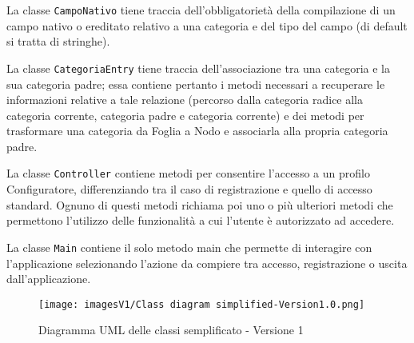 La classe \texttt{CampoNativo} tiene traccia dell'obbligatorietà della compilazione di un campo nativo o ereditato relativo a una categoria e del tipo del campo (di default si tratta di stringhe). 

La classe \texttt{CategoriaEntry} tiene traccia dell'associazione tra una categoria e la sua categoria padre; essa contiene pertanto i metodi necessari a recuperare le informazioni relative a tale relazione (percorso dalla categoria radice alla categoria corrente, categoria padre e categoria corrente) e dei metodi per trasformare una categoria da Foglia a Nodo e associarla alla propria categoria padre.

La classe \texttt{Controller} contiene metodi per consentire l'accesso a un profilo Configuratore, differenziando tra il caso di registrazione e quello di accesso standard. Ognuno di questi metodi richiama poi uno o più ulteriori metodi che permettono l'utilizzo delle funzionalità a cui l'utente è autorizzato ad accedere.

La classe \texttt{Main} contiene il solo metodo main che permette di interagire con l'applicazione selezionando l'azione da compiere tra accesso, registrazione o uscita dall'applicazione.

\begin{figure}[!]
    \centering
    \texttt{[image: imagesV1/Class diagram simplified-Version1.0.png]}
    \caption{\label{fig:Simplified Class Diagram}Diagramma UML delle classi semplificato - Versione 1}
\end{figure}